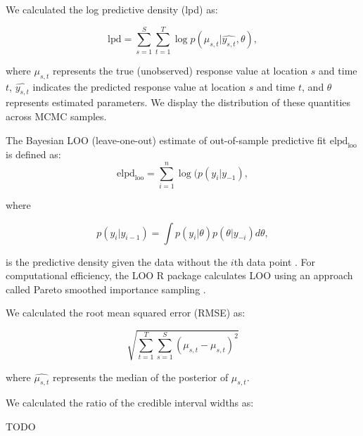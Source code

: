 \documentclass[12pt,english]{article}
\begin{document}
\begin{spacing}{1.2}
We calculated the log predictive density (lpd) as:

\begin{equation}
  \mathrm{lpd} = \sum^{S}_{s=1}{ \sum^{T}_{t=1}{ \log  p(\mu_{s,t} | \widehat{y_{s,t}}, \theta)}},
\end{equation}

\noindent where $\mu_{s,t}$ represents the true (unobserved) response value at
location $s$ and time $t$, $\widehat{y_{s,t}}$ indicates the predicted
response value at location $s$ and time $t$, and $\theta$ represents estimated
parameters. We display the distribution of these quantities across MCMC
samples.

The Bayesian LOO (leave-one-out) estimate of out-of-sample
predictive fit $\mathrm{elpd}_\mathrm{loo}$ is defined as:
\begin{equation}
  \mathrm{elpd}_\mathrm{loo} = \sum^{n}_{i=1}{\log ( p(y_i | y_{-1}) },
\end{equation}

\noindent where

\begin{equation}
  p(y_i | y_{i-1}) = \int p(y_i | \theta) p (\theta | y_{-i}) d \theta ,
\end{equation}

\noindent is the predictive density given the data without the $i$th data
point \citep{vehtari2016}. For computational efficiency, the LOO R package
calculates LOO using an approach called Pareto smoothed importance sampling
\citep{vehtari2016}.

We calculated the root mean squared error (RMSE) as:

\begin{equation}
  \sqrt{ \sum^{T}_{t=1}{ \sum^{S}_{s=1}{ (\mu_{s,t} - \widehat{ \mu_{s,t} })^2 } } }
\end{equation}

\noindent where $\widehat{\mu_{s,t}}$ represents the median of the posterior
of $\mu_{s,t}$.

We calculated the ratio of the credible interval widths as:

TODO

\clearpage

\end{spacing}

\renewcommand{\thefigure}{S\arabic{figure}}
\renewcommand{\thetable}{S\arabic{table}}
\setcounter{figure}{0}
\setcounter{table}{0}
\end{document}
